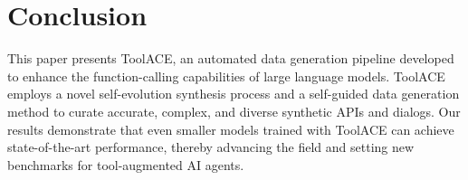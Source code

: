 \documentclass{article}
\begin{document}

% 


% 



\section{Conclusion}
This paper presents ToolACE, an automated data generation pipeline developed to enhance the function-calling capabilities of large language models. ToolACE employs a novel self-evolution synthesis process and a self-guided data generation method to curate accurate, complex, and diverse synthetic APIs and dialogs. Our results demonstrate that even smaller models trained with ToolACE can achieve state-of-the-art performance, thereby advancing the field and setting new benchmarks for tool-augmented AI agents.









\end{document}
